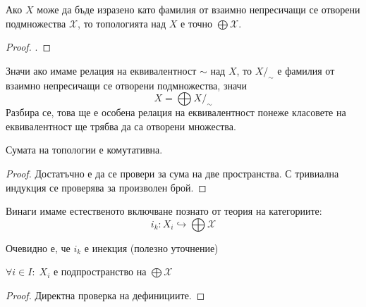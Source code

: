 \begin{proposition}
    Ако $X$ може да бъде изразено като фамилия от взаимно непресичащи се отворени подмножества $\mathcal X$, то топологията над $X$ е точно $\bigoplus \mathcal X$.
\end{proposition}
\begin{proof}
    \cite[p.~75]{engelking1989general}.
\end{proof}
\begin{corollary}
    Значи ако имаме релация на еквивалентност $\sim$ над $X$, то $X/_\sim$ е фамилия от взаимно непресичащи се отворени подмножества, значи
    \begin{equation*}
        X = \bigoplus X/_\sim
    \end{equation*}
    Разбира се, това ще е особена релация на еквивалентност понеже класовете на еквивалентност ще трябва да са отворени множества.
\end{corollary}

\begin{proposition}
    Сумата на топологии е комутативна.
\end{proposition}
\begin{proof}
    Достатъчно е да се провери за сума на две пространства. С тривиална индукция се проверява за произволен брой.
\end{proof}

\begin{notation}
    Винаги имаме естественото включване познато от теория на категориите:
    \begin{equation*}
        i_k : X_i \hookrightarrow \bigoplus \mathcal X
    \end{equation*}
\end{notation}
Очевидно е, че $i_k$ е инекция (полезно уточнение)
\begin{proposition}
    $\forall i \in I:\; X_i$ е подпространство на $\bigoplus \mathcal X$
\end{proposition}
\begin{proof}
    Директна проверка на дефинициите.
\end{proof}

